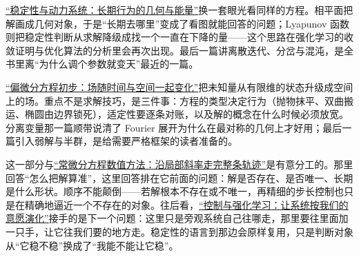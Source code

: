 \hyperref[ch:135]{``稳定性与动力系统：长期行为的几何与能量''}换一套眼光看同样的方程。相平面把解画成几何对象，于是``长期去哪里''变成了看图就能回答的问题；Lyapunov 函数则把稳定性判断从求解降级成找一个一直在下降的量——这个思路在强化学习的收敛证明与优化算法的分析里会再次出现。最后一篇讲离散迭代、分岔与混沌，是全书里离``为什么调个参数就变天''最近的一篇。

\hyperref[ch:136]{``偏微分方程初步：场随时间与空间一起变化''}把未知量从有限维的状态升级成空间上的场。重点不是求解技巧，是三件事：方程的类型决定行为（抛物抹平、双曲搬运、椭圆由边界锁死），适定性要逐条对账，以及解的概念在什么时候必须放宽。分离变量那一篇顺带说清了 Fourier 展开为什么在最对称的几何上才好用；最后一篇引入弱解与半群，是给需要严格框架的读者准备的。

这一部分与\hyperref[ch:066]{``常微分方程数值方法：沿局部斜率走完整条轨迹''}是有意分工的。那里回答``怎么把解算准''，这里回答排在它前面的问题：解是否存在、是否唯一、长期是什么形状。顺序不能颠倒——若解根本不存在或不唯一，再精细的步长控制也只是在精确地逼近一个不存在的对象。往后看，\hyperref[ch:137]{``控制与强化学习：让系统按我们的意愿演化''}接手的是下一个问题：这里只是旁观系统自己往哪走，那里要往里面加一只手，让它往我们要的地方走。稳定性的语言到那边会原样复用，只是判断对象从``它稳不稳''换成了``我能不能让它稳''。
